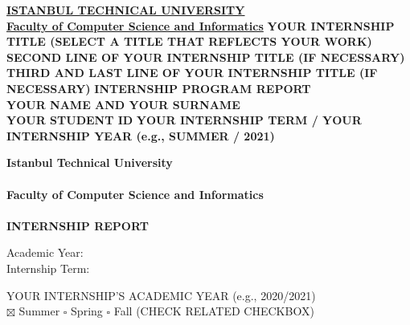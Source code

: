 \documentclass[12pt]{article}
\newcommand{\name}{YOUR NAME AND YOUR SURNAME}
\newcommand{\id}{YOUR STUDENT ID}
\begin{document}


\begin{titlepage}
  \centering
  \underline{\bfseries ISTANBUL TECHNICAL UNIVERSITY} \\
  \underline{\bfseries Faculty of Computer Science and Informatics}
  \vfill
      {\bfseries YOUR INTERNSHIP TITLE (SELECT A TITLE THAT REFLECTS YOUR WORK)} \\
      {\bfseries SECOND LINE OF YOUR INTERNSHIP TITLE (IF NECESSARY)} \\
      {\bfseries THIRD AND LAST LINE OF YOUR INTERNSHIP TITLE (IF NECESSARY)}
      \vfill
          {\fontsize{25}{30}\bfseries INTERNSHIP PROGRAM REPORT} \\
          \vspace{0.4cm}
          {\bfseries \name} \\
          {\bfseries \id}
      \vfill
  {\bfseries YOUR INTERNSHIP TERM / YOUR INTERNSHIP YEAR (e.g., SUMMER / 2021)}
  
\end{titlepage}

{\centering
{\bfseries Istanbul Technical University} \\
\hspace{0.1cm}\\
{\bfseries Faculty of Computer Science and Informatics} \\
\hspace{0.1cm}\\
{\bfseries INTERNSHIP REPORT} \\[1\baselineskip] \par}
\begin{minipage}[t]{.3\textwidth}
  \begin{flushright}
    Academic Year: \\
    Internship Term:
  \end{flushright}
\end{minipage}%
\hspace{0.5cm}
\begin{minipage}[t]{.7\textwidth}
  YOUR INTERNSHIP'S ACADEMIC YEAR (e.g., 2020/2021) \\
  $\boxtimes$ Summer  $\square$ Spring  $\square$ Fall (CHECK RELATED CHECKBOX) \\ 
\end{minipage}
\end{document}
